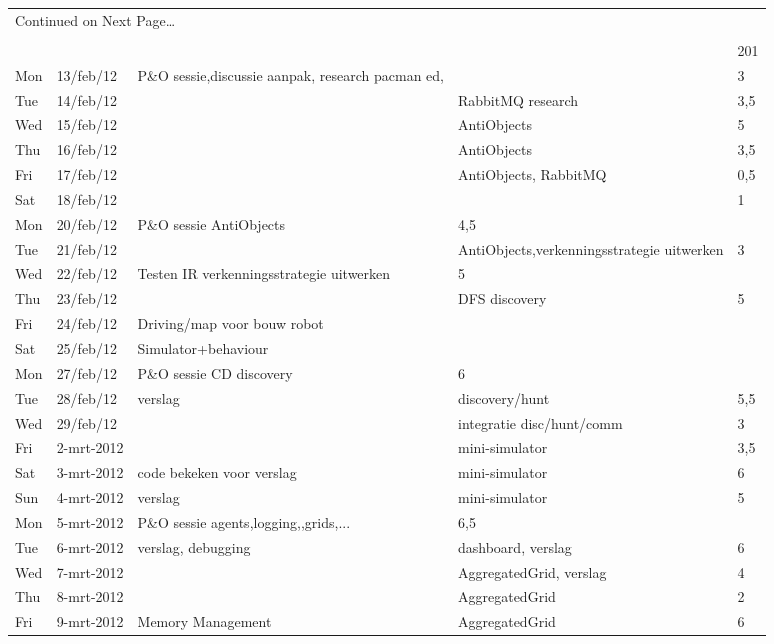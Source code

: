 \documentclass[12pt,a4paper]{report}
\begin{document}
\begin{landscape}
\begin{longtable}{llp{7cm}p{10cm}l}
\multicolumn{5}{l}{{Continued on Next Page\ldots}} \\
\endfoot

\\[-1.8ex] \hline \hline
\endlastfoot

 
\hline
 &  &  &  & 201 \\ 
\hline
Mon & 13/feb/12 & P\&O sessie,discussie aanpak, research pacman ed,  &  & 3 \\ 
\hline
Tue & 14/feb/12 &  & RabbitMQ research & 3,5 \\ 
\hline
Wed & 15/feb/12 &  & AntiObjects & 5 \\ 
\hline
Thu & 16/feb/12 &  & AntiObjects & 3,5 \\ 
\hline
Fri & 17/feb/12 &  & AntiObjects, RabbitMQ & 0,5 \\ 
\hline
Sat & 18/feb/12 &  &  & 1 \\ 
\hline
Mon & 20/feb/12 & P\&O sessie AntiObjects & 4,5 \\ 
\hline
Tue & 21/feb/12 &  & AntiObjects,verkenningsstrategie uitwerken & 3 \\ 
\hline
Wed & 22/feb/12 & Testen IR verkenningsstrategie uitwerken & 5 \\ 
\hline
Thu & 23/feb/12 &  & DFS discovery & 5 \\ 
\hline
Fri & 24/feb/12 & Driving/map voor bouw robot &  &  \\ 
\hline
Sat & 25/feb/12 & Simulator+behaviour &  &  \\ 
\hline
Mon & 27/feb/12 & P\&O sessie CD discovery & 6 \\ 
\hline
Tue & 28/feb/12 & verslag & discovery/hunt & 5,5 \\ 
\hline
Wed & 29/feb/12 &  & integratie disc/hunt/comm & 3 \\ 
\hline
Fri & 2-mrt-2012 &  & mini-simulator & 3,5 \\ 
\hline
Sat & 3-mrt-2012 & code bekeken voor verslag & mini-simulator & 6 \\ 
\hline
Sun & 4-mrt-2012 & verslag & mini-simulator & 5 \\ 
\hline
Mon & 5-mrt-2012 & P\&O sessie agents,logging,,grids,... & 6,5 \\ 
\hline
Tue & 6-mrt-2012 & verslag, debugging & dashboard, verslag & 6 \\ 
\hline
Wed & 7-mrt-2012 &  & AggregatedGrid, verslag & 4 \\ 
\hline
Thu & 8-mrt-2012 &  & AggregatedGrid & 2 \\ 
\hline
Fri & 9-mrt-2012 & Memory Management & AggregatedGrid & 6 \\ 

\end{longtable}
\end{landscape}
\end{document}

